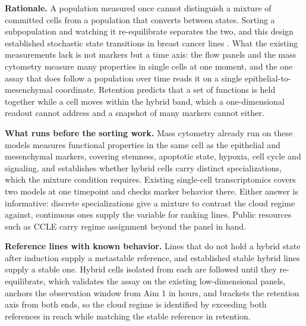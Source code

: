 \documentclass[12pt,letterpaper]{article}
\newcommand{\chg}[1]{\textcolor{chgcolor}{#1}}
\newcommand{\chg}[1]{#1}
\newcommand{\lead}[1]{\textbf{#1}}
\begin{document}
\lead{Rationale.} A population measured once cannot distinguish a mixture of committed cells from a population that converts between states. Sorting a subpopulation and watching it re-equilibrate separates the two, and this design established stochastic state transitions in breast cancer lines \cite{gupta2011}. \chg{What the existing measurements lack is not markers but a time axis: the flow panels and the mass cytometry measure many properties in single cells at one moment, and the one assay that does follow a population over time reads it on a single epithelial-to-mesenchymal coordinate. Retention predicts that a set of functions is held together while a cell moves within the hybrid band, which a one-dimensional readout cannot address and a snapshot of many markers cannot either.}

\lead{What runs before the sorting work.} Mass cytometry already run on these models measures functional properties in the same cell as the epithelial and mesenchymal markers, covering stemness, apoptotic state, hypoxia, cell cycle and signaling, and establishes whether hybrid cells carry distinct specializations, which the mixture condition requires. Existing single-cell transcriptomics covers two models at one timepoint and checks marker behavior there. Either answer is informative: discrete specializations give a mixture to contrast the cloud regime against, continuous ones supply the variable for ranking lines. Public resources such as CCLE carry regime assignment beyond the panel in hand.

\lead{Reference lines with known behavior.} Lines that do not hold a hybrid state after induction supply a metastable reference, and established stable hybrid lines supply a stable one. Hybrid cells isolated from each are followed until they re-equilibrate, which validates the assay on the existing low-dimensional panels, anchors the observation window from Aim 1 in hours, and brackets the retention axis from both ends, so the cloud regime is identified by exceeding both references in reach while matching the stable reference in retention.
\end{document}
